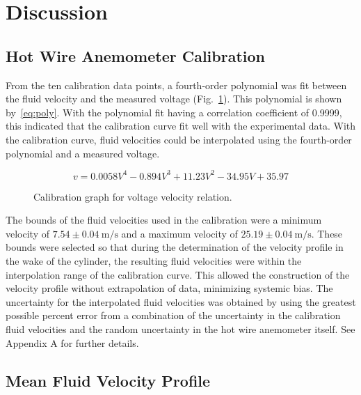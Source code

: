 \documentclass[journal,letterpaper]{IEEEtran}
\begin{document}
\section{Discussion}

\subsection{Hot Wire Anemometer Calibration}

From the ten calibration data points, a fourth-order polynomial was fit between the fluid velocity and the measured voltage (Fig.~\ref{fig:calCurve}).
This polynomial is shown by~\eqref{eq:poly}.
With the polynomial fit having a correlation coefficient of 0.9999, this indicated that the calibration curve fit well with the experimental data.
With the calibration curve, fluid velocities could be interpolated using the fourth-order polynomial and a measured voltage.

\begin{equation} \label{eq:poly}
    v = 0.0058V^4 - 0.894V^3 + 11.23V^2 - 34.95V + 35.97
\end{equation}

\begin{figure}[H]
    \centering
    
    \caption{Calibration graph for voltage velocity relation.}
    \label{fig:calCurve}
\end{figure}

The bounds of the fluid velocities used in the calibration were a minimum velocity of $7.54 \pm \qty{0.04}{\m\per\s}$ and a maximum velocity of $25.19 \pm \qty{0.04}{\m\per\s}$.
These bounds were selected so that during the determination of the velocity profile in the wake of the cylinder, the resulting fluid velocities were within the interpolation range of the calibration curve.
This allowed the construction of the velocity profile without extrapolation of data, minimizing systemic bias.
The uncertainty for the interpolated fluid velocities was obtained by using the greatest possible percent error from a combination of the uncertainty in the calibration fluid velocities and the random uncertainty in the hot wire anemometer itself.
See Appendix A for further details.

\subsection{Mean Fluid Velocity Profile}
\end{document}
